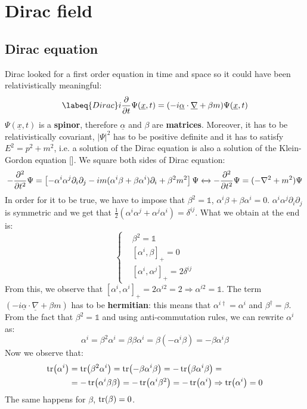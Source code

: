 \documentclass[../main.tex]{subfiles}
\begin{document}
\setchapterpreamble[u]{\margintoc}
\chapter[Dirac field]{Dirac field\footnotemark[0]}
\section{Dirac equation}
Dirac looked for a first order equation in time and space so it could have been relativistically meaningful:
\begin{equation}
\labeq{Dirac}
i\frac{\partial}{\partial t}\Psi(\underline{x},t)=(-i\underline{\alpha}\cdot\underline{\nabla}+\beta m)\Psi(\underline{x},t)
\end{equation}
$\Psi(\underline{x},t)$ is a \textbf{spinor}, therefore $\underline{\alpha}$ and $\beta$ are \textbf{matrices}. Moreover, it has to be relativistically covariant, $|\Psi|^2$ has to be positive definite and it has to satisfy $E^2=p^2+m^2$, i.e. a solution of the Dirac equation is also a solution of the Klein-Gordon equation []. We square both sides of Dirac equation:
\[
-\frac{\partial^2}{\partial t^2}\Psi=\left[-\alpha^i\alpha^j\partial_i\partial_j-im(\alpha^i\beta+\beta\alpha^i)\partial_i+\beta^2 m^2\right]\Psi\xleftrightarrow[]{}-\frac{\partial^2}{\partial t^2}\Psi=(-\nabla^2+m^2)\Psi
\]
In order for it to be true, we have to impose that $\beta^2=\mathbb{1}$,
$\alpha^i\beta+\beta\alpha^i=0$. $\alpha^i\alpha^j\partial_i\partial_j$ is symmetric and we get that $\frac{1}{2}(\alpha^i\alpha^j+\alpha^j\alpha^i)=\delta^{ij}$. What we obtain at the end is:
\[
\left\{
\begin{aligned}
&\beta^2=\mathbb{1}\\
&[\alpha^i,\beta]_+=0\\
&[\alpha^i,\alpha^j]_+=2\delta^{ij}
\end{aligned}
\right.
\]
From this, we observe that $[\alpha^i,\alpha^i]_+=2\alpha^{i2}=2\Rightarrow\alpha^{i2}=\mathbb{1}$. The term $(-i\underline{\alpha}\cdot\underline{\nabla}+\beta m)$ has to be \textbf{hermitian}: this means that $\alpha^{i\dagger}=\alpha^i$ and $\beta^\dagger=\beta$. From the fact that $\beta^2=\mathbb{1}$ and using anti-commutation rules, we can rewrite $\alpha^i$ as:
\[
\alpha^i=\beta^2\alpha^i=\beta\beta\alpha^i=\beta(-\alpha^i\beta)=-\beta\alpha^i\beta
\]
Now we observe that:
\begin{align*}
\tr(\alpha^i)&=\tr(\beta^2\alpha^i)=\tr(-\beta\alpha^i\beta)=-\tr(\beta\alpha^i\beta)=\\
&=-\tr(\alpha^i\beta\beta)=-\tr(\alpha^i\beta^2)=-\tr(\alpha^i)\Rightarrow\tr(\alpha^i)=0
\end{align*}
The same happens for $\beta$, $\tr(\beta)=0$.
\end{document}
